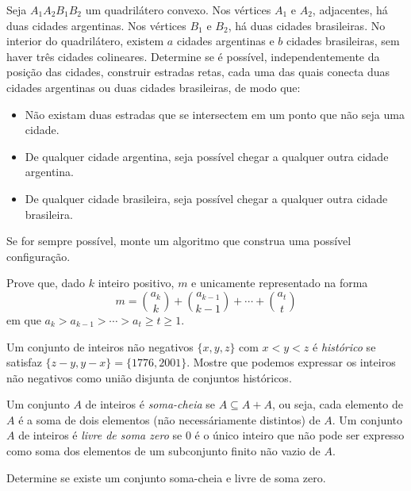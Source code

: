 \documentclass[10pt,a4paper]{article}
\begin{document}
	\begin{prob}
		Seja $A_1A_2B_1B_2$ um quadrilátero convexo. Nos vértices $A_1$ e $A_2$, adjacentes, há duas cidades argentinas. Nos vértices $B_1$ e $B_2$, há duas cidades brasileiras. No interior do quadrilátero, existem $a$ cidades argentinas e $b$ cidades brasileiras, sem haver três cidades colineares.
		Determine se é possível, independentemente da posição das cidades, construir estradas retas, cada uma das quais conecta duas cidades argentinas ou duas cidades brasileiras, de modo que:
		\begin{itemize}
			\item Não existam duas estradas que se intersectem em um ponto que não seja uma cidade.
			\item De qualquer cidade argentina, seja possível chegar a qualquer outra cidade argentina.
			\item De qualquer cidade brasileira, seja possível chegar a qualquer outra cidade brasileira.
		\end{itemize}

		Se for sempre possível, monte um algoritmo que construa uma possível configuração.
	\end{prob}

	\begin{prob}
		Prove que, dado $k$ inteiro positivo, $m$ e unicamente representado na forma
		$$ m = \binom{a_k}{k} + \binom{a_{k-1}}{k-1} + \cdots + \binom{a_t}{t}$$
		em que $a_k > a_{k-1} > \cdots > a_t \ge t \ge 1$.
	\end{prob}

	\begin{prob}
		Um conjunto de inteiros não negativos $\{x, y, z\}$ com $x < y < z$ é \emph{histórico} se satisfaz $\{z-y, y-x\} = \{1776, 2001\}$.
		Mostre que podemos expressar os inteiros não negativos como união disjunta de conjuntos históricos.
	\end{prob}

	\begin{prob}
		Um conjunto $A$ de inteiros é \emph{soma-cheia} se $A \subseteq A + A$, ou seja, cada elemento de $A$ é a soma de dois elementos (não necessáriamente distintos) de $A$. Um conjunto $A$ de inteiros é \emph{livre de soma zero} se $0$ é o único inteiro que não pode ser expresso como soma dos elementos de um subconjunto finito não vazio de $A$.

		Determine se existe um conjunto soma-cheia e livre de soma zero.
	\end{prob}
\end{document}
